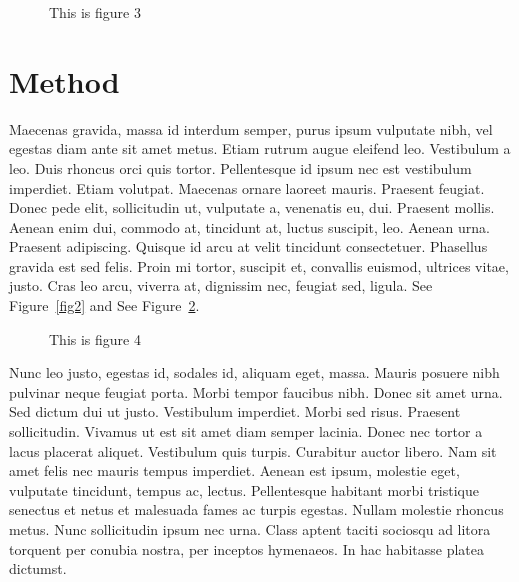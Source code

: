 ﻿\documentclass{report}
\begin{document}
\begin{figure}[h]
\begin{center}
\vspace{2cm}
\label{fig3}
\caption{This is figure 3}
\end{center}
\end{figure}

\section{Method}
Maecenas gravida, massa id interdum semper, purus ipsum vulputate nibh, vel
egestas diam ante sit amet metus. Etiam rutrum augue eleifend leo. Vestibulum a
leo. Duis rhoncus orci quis tortor. Pellentesque id ipsum nec est vestibulum
imperdiet. Etiam volutpat. Maecenas ornare laoreet mauris. Praesent feugiat.
Donec pede elit, sollicitudin ut, vulputate a, venenatis eu, dui. Praesent
mollis. Aenean enim dui, commodo at, tincidunt at, luctus suscipit, leo. Aenean
urna. Praesent adipiscing. Quisque id arcu at velit tincidunt consectetuer.
Phasellus gravida est sed felis. Proin mi tortor, suscipit et, convallis
euismod, ultrices vitae, justo. Cras leo arcu, viverra at, dignissim nec,
feugiat sed, ligula.  See Figure~\ref{fig2} and See Figure~\ref{fig4}.

\begin{figure}[h]
\begin{center}
\vspace{2cm}
\label{fig4}
\caption{This is figure 4}
\end{center}
\end{figure}

Nunc leo justo, egestas id, sodales id, aliquam eget, massa. Mauris posuere nibh
pulvinar neque feugiat porta. Morbi tempor faucibus nibh. Donec sit amet urna.
Sed dictum dui ut justo. Vestibulum imperdiet. Morbi sed risus. Praesent
sollicitudin. Vivamus ut est sit amet diam semper lacinia. Donec nec tortor a
lacus placerat aliquet. Vestibulum quis turpis. Curabitur auctor libero. Nam sit
amet felis nec mauris tempus imperdiet. Aenean est ipsum, molestie eget,
vulputate tincidunt, tempus ac, lectus. Pellentesque habitant morbi tristique
senectus et netus et malesuada fames ac turpis egestas. Nullam molestie rhoncus
metus. Nunc sollicitudin ipsum nec urna. Class aptent taciti sociosqu ad litora
torquent per conubia nostra, per inceptos hymenaeos. In hac habitasse platea
dictumst. 
\end{document}
